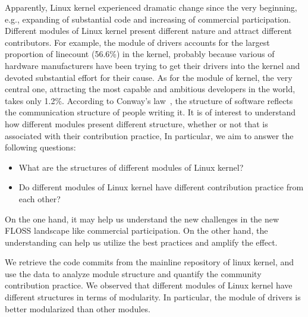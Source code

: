 \documentclass{sig-alternate-05-2015}
\begin{document}
{Apparently, Linux kernel experienced dramatic change since the very
beginning, e.g., expanding of substantial code and increasing of commercial participation.
Different modules of Linux kernel present different nature
and attract different contributors. For example, the module of drivers
accounts for the largest proportion of linecount (56.6\%) in the kernel,
probably because various of
hardware manufacturers have been trying to get their drivers into the kernel
and devoted substantial effort for their cause.
 As for the module of kernel, the very central one, attracting the most
capable and ambitious developers in the world, takes only 1.2\%.
According to Conway's law~\cite{conway}, the structure of software reflects
the communication structure of people writing it.
It is of interest to understand how different modules present different
structure, whether or not that is associated with their contribution practice,
In particular, we aim to answer the following questions:
\begin{itemize}
\item What are the structures of different modules of Linux kernel?
\item Do different modules of Linux kernel have different contribution practice from each other?

\end{itemize}
On the one hand,
it may help us understand the new challenges in the new FLOSS landscape like
commercial participation. %
On the other hand, the understanding can help us
utilize the best practices and amplify the effect.


We retrieve the code commits from the mainline repository of linux kernel, and
use the data to analyze module structure and quantify the community contribution practice.
We observed that different modules of Linux kernel have different structures in terms of modularity.
In particular, the module of drivers is better modularized than other modules.

}
\end{document}
